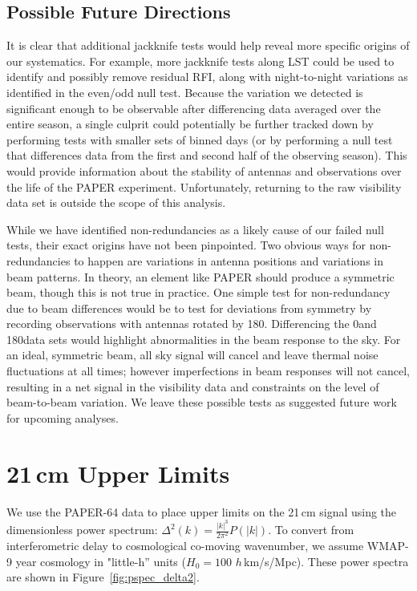 \subsection{Possible Future Directions}

It is clear that additional jackknife tests would help reveal more specific origins of our systematics. For example, more jackknife tests along LST could be used to identify and possibly remove residual RFI, along with night-to-night variations as identified in the even/odd null test. Because the variation we detected is significant enough to be observable after differencing data averaged over the entire season, a single culprit could potentially be further tracked down by performing tests with smaller sets of binned days (or by performing a null test that differences data from the first and second half of the observing season). This would provide information about the stability of antennas and observations over the life of the PAPER experiment. Unfortunately, returning to the raw visibility data set is outside the scope of this analysis.

While we have identified non-redundancies as a likely cause of our failed null tests, their exact origins have not been pinpointed. Two obvious ways for non-redundancies to happen are variations in antenna positions and variations in beam patterns. In theory, an element like PAPER should produce a symmetric beam, though this is not true in practice. One simple test for non-redundancy due to beam differences would be to test for deviations from symmetry by recording observations with antennas rotated by 180\arcdeg. Differencing the 0\arcdeg and 180\arcdeg data sets would highlight abnormalities in the beam response to the sky. For an ideal, symmetric beam, all sky signal will cancel and leave thermal noise fluctuations at all times; however imperfections in beam responses will not cancel, resulting in a net signal in the visibility data and constraints on the level of beam-to-beam variation. We leave these possible tests as suggested future work for upcoming analyses.

\section{21\,cm Upper Limits}
\label{sec:upperlims}

We use the PAPER-64 data to place upper limits on the 21\,cm signal using the
dimensionless power spectrum: $\Delta^{2}(k)= \frac{|k|^{3}}{2\pi^{2}}P(|k|)$. To convert from
interferometric delay to cosmological co-moving wavenumber, we assume WMAP-9 year cosmology in "little-h'' units ($ H_{0}=100 $ $ h\, $km/s/Mpc). These power spectra are shown in Figure~\ref{fig:pspec_delta2}.

